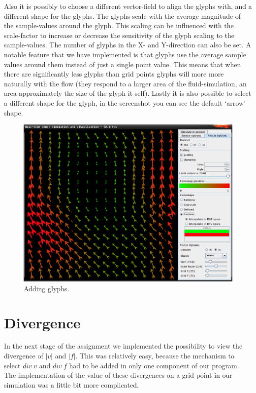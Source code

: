 \documentclass[a4paper,11pt,twoside]{report}
\begin{document}
		Also it is possibly to choose a different vector-field to align the glyphs with, and a different shape for the glyphs. The glyphs scale with the average magnitude of the sample-values around the glyph. This scaling can be influenced with the scale-factor to increase or decrease the sensitivity of the glyph scaling to the sample-values. The number of glyphs in the X- and Y-direction can also be set. A notable feature that we have implemented is that glyphs use the average sample values around them instead of just a single point value. This means that when there are significantly less glyphs than grid points glyphs will more more naturally with the flow (they respond to a larger area of the fluid-simulation, an area approximately the size of the glyph it self).
		Lastly it is also possible to select a different shape for the glyph, in the screenshot you can see the default `arrow' shape.
		\begin{figure}[h]
		\centering
		\includegraphics[scale=\imagescalefactor]{images/step3.png}
		\caption{Adding glyphs.}\label{fig:step3}
		\end{figure}
		\clearpage
	\section{Divergence}
        In the next stage of the assignment we implemented the possibility to view the divergence of $|v|$ and $|f|$. This was relatively easy, because the mechanism to select $div~v$ and $div~f$ had to be added in only one component of our program. The implementation of the value of these divergences on a grid point in our simulation was a little bit more complicated.
\end{document}
